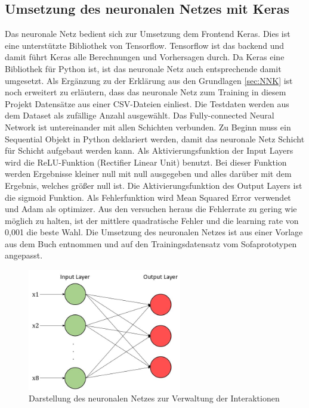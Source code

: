 \subsection{Umsetzung des neuronalen Netzes mit Keras}
Das neuronale Netz bedient sich zur Umsetzung dem Frontend Keras. Dies ist eine unterstützte Bibliothek von Tensorflow. Tensorflow ist das backend und damit führt Keras alle Berechnungen und Vorhersagen durch. Da Keras eine Bibliothek für Python ist, ist das neuronale Netz auch entsprechende damit umgesetzt.
\newline
Als Ergänzung zu der Erklärung aus den Grundlagen \ref{sec:NNK} ist noch erweitert zu erläutern, dass das neuronale Netz zum Training in diesem Projekt Datensätze aus einer CSV-Dateien einliest. Die Testdaten werden aus dem Dataset als zufällige Anzahl ausgewählt. 
\newline
Das Fully-connected Neural Network ist untereinander mit allen Schichten verbunden. Zu Beginn muss ein Sequential Objekt in Python deklariert werden, damit das neuronale Netz Schicht für Schicht aufgebaut werden kann. Als Aktivierungsfunktion der Input Layers wird die ReLU-Funktion (Rectifier Linear Unit) benutzt. Bei dieser Funktion werden Ergebnisse kleiner null mit null ausgegeben und alles darüber mit dem Ergebnis, welches größer null ist. Die Aktivierungsfunktion des Output Layers ist die sigmoid Funktion. Als Fehlerfunktion wird Mean Squared Error verwendet und Adam als optimizer.
\newline
Aus den versuchen heraus die Fehlerrate zu gering wie möglich zu halten, ist der mittlere quadratische Fehler und die learning rate von 0,001 die beste Wahl.
Die Umsetzung des neuronalen Netzes ist aus einer Vorlage aus dem Buch \citep{frochte2018} entnommen und auf den Trainingsdatensatz vom Sofaprototypen angepasst.


\begin{figure}[H]
	\centering
		\includegraphics[width=0.6\textwidth]{images/NN.jpg}
	\caption{Darstellung des neuronalen Netzes zur Verwaltung der Interaktionen}
	\label{fig:NN}
\end{figure}

